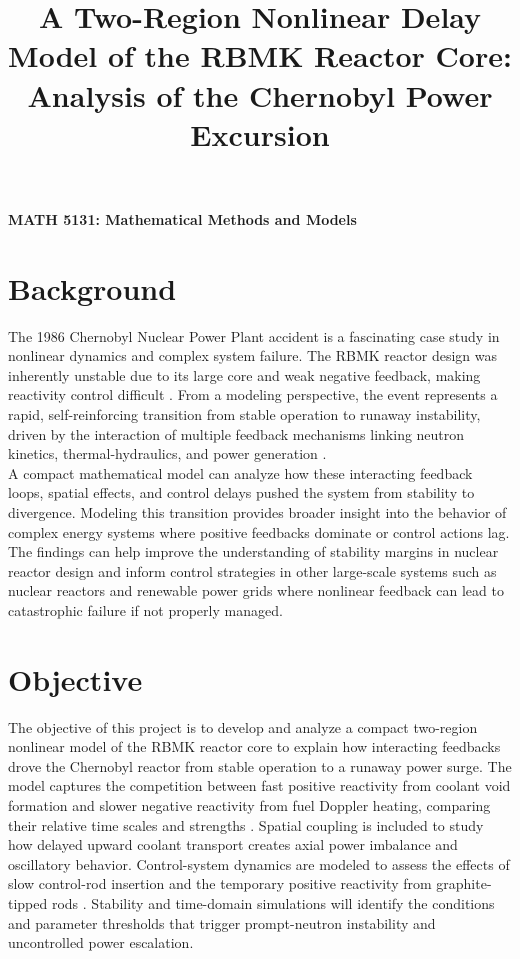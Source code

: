 \documentclass[11pt]{article}
\title{A Two-Region Nonlinear Delay Model of the RBMK Reactor Core: Analysis of the Chernobyl Power Excursion}
\author{}
\date{}
\begin{document}
\maketitle

\begin{center}
\textbf{MATH 5131: Mathematical Methods and Models}
\end{center}

\section{Background}
The 1986 Chernobyl Nuclear Power Plant accident is a fascinating case study in nonlinear dynamics and complex system failure. The RBMK reactor design was inherently unstable due to its large core and weak negative feedback, making reactivity control difficult \cite{INSAG7,WNA_RBMK}. From a modeling perspective, the event represents a rapid, self-reinforcing transition from stable operation to runaway instability, driven by the interaction of multiple feedback mechanisms linking neutron kinetics, thermal-hydraulics, and power generation \cite{NP_Chernobyl,NEA_Chapter1}.\\

A compact mathematical model can analyze how these interacting feedback loops, spatial effects, and control delays pushed the system from stability to divergence. Modeling this transition  provides broader insight into the behavior of complex energy systems where positive feedbacks dominate or control actions lag. The findings can help improve the understanding of stability margins in nuclear reactor design and inform control strategies in other large-scale systems such as nuclear reactors and renewable power grids where nonlinear feedback can lead to catastrophic failure if not properly managed.

\section{Objective}
The objective of this project is to develop and analyze a compact two-region nonlinear model of the RBMK reactor core to explain how interacting feedbacks drove the Chernobyl reactor from stable operation to a runaway power surge. The model captures the competition between fast positive reactivity from coolant void formation and slower negative reactivity from fuel Doppler heating, comparing their relative time scales and strengths \cite{Duderstadt1976,Lewis2008}. Spatial coupling is included to study how delayed upward coolant transport creates axial power imbalance and oscillatory behavior. Control-system dynamics are modeled to assess the effects of slow control-rod insertion and the temporary positive reactivity from graphite-tipped rods \cite{INSAG7}. Stability and time-domain simulations will identify the conditions and parameter thresholds that trigger prompt-neutron instability and uncontrolled power escalation.
\end{document}
